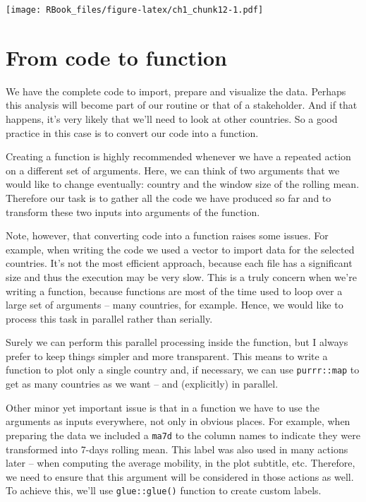 \documentclass[
]{book}
\begin{document}
\texttt{[image: RBook\_files/figure-latex/ch1\_chunk12-1.pdf]}

\hypertarget{from-code-to-function}{%
\section{From code to function}\label{from-code-to-function}}

We have the complete code to import, prepare and visualize the data. Perhaps this analysis will become part of our routine or that of a stakeholder. And if that happens, it's very likely that we'll need to look at other countries. So a good practice in this case is to convert our code into a function.

Creating a function is highly recommended whenever we have a repeated action on a different set of arguments. Here, we can think of two arguments that we would like to change eventually: country and the window size of the rolling mean. Therefore our task is to gather all the code we have produced so far and to transform these two inputs into arguments of the function.

Note, however, that converting code into a function raises some issues. For example, when writing the code we used a vector to import data for the selected countries. It's not the most efficient approach, because each file has a significant size and thus the execution may be very slow. This is a truly concern when we're writing a function, because functions are most of the time used to loop over a large set of arguments -- many countries, for example. Hence, we would like to process this task in parallel rather than serially.

Surely we can perform this parallel processing inside the function, but I always prefer to keep things simpler and more transparent. This means to write a function to plot only a single country and, if necessary, we can use \texttt{purrr::map} to get as many countries as we want -- and (explicitly) in parallel.

Other minor yet important issue is that in a function we have to use the arguments as inputs everywhere, not only in obvious places. For example, when preparing the data we included a \texttt{ma7d} to the column names to indicate they were transformed into 7-days rolling mean. This label was also used in many actions later -- when computing the average mobility, in the plot subtitle, etc. Therefore, we need to ensure that this argument will be considered in those actions as well. To achieve this, we'll use \texttt{glue::glue()} function to create custom labels.
\end{document}
